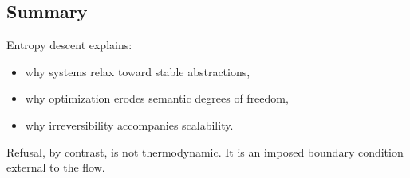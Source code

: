 \subsection{Summary}

Entropy descent explains:
\begin{itemize}
  \item why systems relax toward stable abstractions,
  \item why optimization erodes semantic degrees of freedom,
  \item why irreversibility accompanies scalability.
\end{itemize}

Refusal, by contrast, is not thermodynamic.
It is an imposed boundary condition external to the flow.

